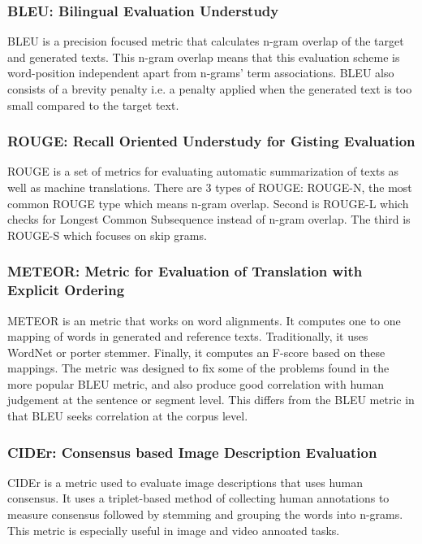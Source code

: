 \subsubsection{BLEU: Bilingual Evaluation Understudy}

\par BLEU \cite{bleu} is a precision focused metric that calculates n-gram overlap of the target and generated texts. This n-gram overlap means that this evaluation scheme is word-position independent apart from n-grams' term associations. BLEU also consists of a brevity penalty i.e. a penalty applied when the generated text is too small compared to the target text.


\subsubsection{ROUGE: Recall Oriented Understudy for Gisting Evaluation}

\par ROUGE \cite{rouge} is a set of metrics for evaluating automatic summarization of texts as well as machine translations. There are 3 types of ROUGE: ROUGE-N, the most common ROUGE type which means n-gram overlap. Second is ROUGE-L which checks for Longest Common Subsequence instead of n-gram overlap. The third is ROUGE-S which focuses on skip grams.


\subsubsection{METEOR: Metric for Evaluation of Translation with Explicit Ordering}

\par METEOR \cite{meteor} is an metric that works on word alignments. It computes one to one mapping of words in generated and reference texts. Traditionally, it uses WordNet or porter stemmer. Finally, it computes an F-score based on these mappings. The metric was designed to fix some of the problems found in the more popular BLEU metric, and also produce good correlation with human judgement at the sentence or segment level. This differs from the BLEU metric in that BLEU seeks correlation at the corpus level.


\subsubsection{CIDEr: Consensus based Image Description Evaluation}

\par CIDEr \cite{cider} is a metric used to evaluate image descriptions that uses human consensus. It uses a triplet-based method of collecting human annotations to measure consensus followed by stemming and grouping the words into n-grams. This metric is especially useful in image and video annoated tasks.

